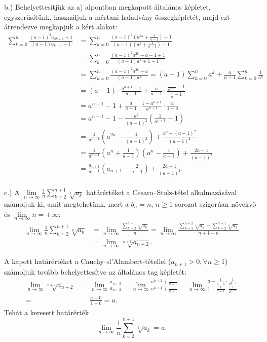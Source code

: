 \begin{solution}
b.) Behelyettesítjük az a) alpontban megkapott általános képletet,
egyszerűsítünk, használjuk a mértani haladvány összegképletét, majd
ezt átrendezve megkapjuk a kért alakot: 
\begin{align*}
\sum\limits_{k=0}^{n}\frac{(a-1)^{2}a_{2k+1}+1}{(a-1)a_{k+1}-1} & =\sum\limits_{k=0}^{n}\frac{(a-1)^{2}\left(a^{2k}+\frac{1}{a-1}\right)+1}{(a-1)\left(a^{k}+\frac{1}{a-1}\right)-1}\\
 & =\sum\limits_{k=0}^{n}\frac{(a-1)^{2}a^{2k}+a-1+1}{(a-1)a^{k}+1-1}\\
 & =\sum\limits_{k=0}^{n}\frac{(a-1)^{2}a^{2k}+a}{(a-1)a^{k}}=(a-1)\sum\limits_{k=0}^{n}a^{k}+\frac{a}{a-1}\sum\limits_{k=0}^{n}\frac{1}{a^{k}}\\
 & =(a-1)\cdot\frac{a^{n+1}-1}{a-1}+\frac{a}{a-1}\cdot\frac{\frac{1}{a^{n+1}}-1}{\frac{1}{a}-1}\\
 & =a^{n+1}-1+\frac{a}{a-1}\cdot\frac{1-a^{n+1}}{a^{n+1}}\cdot\frac{a}{1-a}\\
 & =a^{n+1}-1-\frac{a^{2}}{(a-1)^{2}}\left(\frac{1}{a^{n+1}}-1\right)\\
 & =\frac{1}{a^{n-1}}\left(a^{2n}-\frac{1}{(a-1)^{2}}\right)+\frac{a^{2}-(a-1)^{2}}{(a-1)^{2}}\\
 & =\frac{1}{a^{n-1}}\left(a^{n}+\frac{1}{a-1}\right)\left(a^{n}-\frac{1}{a-1}\right)+\frac{2a-1}{(a-1)^{2}}\\
 & =\frac{a_{n+1}}{a^{n-1}}\left(a_{n+1}-\frac{2}{a-1}\right)+\frac{2a-1}{(a-1)^{2}}.
\end{align*}
\\
 c.) A ${\displaystyle \lim\limits_{n\to\infty}\frac{1}{n}\sum\limits_{k=2}^{n+1}\sqrt[k]{a_{k}}}$
határértéket a Cesaro--Stolz-tétel alkalmazásával számoljuk ki, amit
megtehetünk, mert a $b_{n}=n$, $n\geq1$ sorozat szigorúan növekvő
és $\lim\limits_{n\to\infty}n=+\infty$: 
\[
\begin{aligned}\lim\limits_{n\to\infty}\frac{1}{n}\sum\limits_{k=2}^{n+1}\sqrt[k]{a_{k}} & =\lim\limits_{n\to\infty}\frac{\sum\limits_{k=2}^{n+1}\sqrt[k]{a_{k}}}{n}=\lim\limits_{n\to\infty}\frac{\sum\limits_{k=2}^{n+2}\sqrt[k]{a_{k}}-\sum\limits_{k=2}^{n+1}\sqrt[k]{a_{k}}}{n+1-n}\\
 & =\lim\limits_{n\to\infty}\sqrt[n+2]{a_{n+2}}.
\end{aligned}
\]

A kapott határértéket a Cauchy--d'Alambert-tétellel ($a_{n+1}>0,\forall n\geq1$)
számoljuk tovább behelyettesítve az általános tag képletét: 
\[
\begin{aligned}\lim\limits_{n\to\infty}\sqrt[n+2]{a_{n+2}}= & \lim\limits_{n\to\infty}\frac{a_{n+3}}{a_{n+2}}=\lim\limits_{n\to\infty}\frac{a^{n+2}+\frac{1}{a-1}}{a^{n+1}+\frac{1}{a-1}}=\lim\limits_{n\to\infty}\frac{a+\frac{1}{a-1}\cdot\frac{1}{a^{n+1}}}{1+\frac{1}{a-1}\cdot\frac{1}{a^{n+1}}}\\
= & \frac{a+0}{1+0}=a.
\end{aligned}
\]
Tehát a keresett határérték 
\[
\lim\limits_{n\to\infty}\frac{1}{n}\sum\limits_{k=2}^{n+1}\sqrt[k]{a_{k}}=a.
\]
\end{solution}
